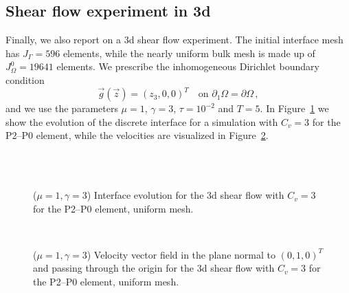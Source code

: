 \subsection{Shear flow experiment in 3d}
Finally, we also report on a 3d shear flow experiment.
The initial interface mesh has $J_\Gamma = 596$ elements, while the nearly
uniform bulk mesh is made up of $J_\Omega^0 = 19641$ elements. We prescribe the
inhomogeneous Dirichlet boundary condition
\begin{equation*}
\vec g(\vec z)=(z_3,0,0)^T\quad \mbox{on }\partial_1\Omega=\partial\Omega\,,
\end{equation*}
and we use the parameters $\mu=1$, $\gamma=3$, $\tau=10^{-2}$ and $T=5$.
In Figure~\ref{fig:shear_3d} we show the evolution of the discrete interface
for a simulation with $C_v=3$ for the P2--P0 element, while the velocities
are visualized in Figure~\ref{fig:shear_3d_velocity}.
\begin{figure}[htbp]
\centering
{}\\
\\
\caption[Stokes 3d shear flow interface]
{($\mu=1,\gamma=3$) Interface evolution for the 3d shear flow with $C_v=3$ for
the P2--P0 element, uniform mesh.}
\label{fig:shear_3d}
\end{figure}
\begin{figure}[htbp]
\centering
{}
\\
\caption[Stokes 3d shear flow velocity]
{($\mu=1,\gamma=3$) Velocity vector field in the plane normal to $(0,1,0)^T$
and passing through the origin for the 3d shear flow with $C_v=3$ for the
P2--P0 element, uniform mesh.}
\label{fig:shear_3d_velocity}
\end{figure}

